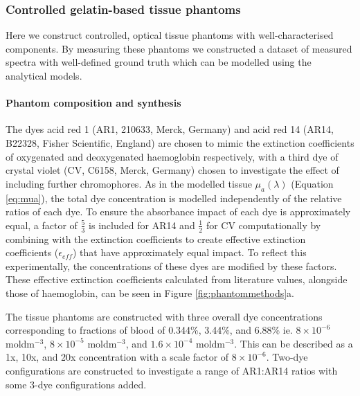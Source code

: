\subsubsection{Controlled gelatin-based tissue phantoms}\label{sec:methodsphantoms}
Here we construct controlled, optical tissue phantoms with well-characterised components. By measuring these phantoms we constructed a dataset of measured spectra with well-defined ground truth which can be modelled using the analytical models.

\paragraph{Phantom composition and synthesis}\label{sec:methodsphantomcomposition}

The dyes acid red 1 (AR1, 210633, Merck, Germany) and acid red 14 (AR14, B22328, Fisher Scientific, England) are chosen to mimic the extinction coefficients of oxygenated and deoxygenated haemoglobin respectively, with a third dye of crystal violet (CV, C6158, Merck, Germany) chosen to investigate the effect of including further chromophores. As in the modelled tissue $\mu_a(\lambda)$ (Equation \eqref{eq:mua}), the total dye concentration is modelled independently of the relative ratios of each dye. To ensure the absorbance impact of each dye is approximately equal, a factor of $\frac{5}{3}$ is included for AR14 and $\frac{1}{2}$ for CV computationally by combining with the extinction coefficients to create effective extinction coefficients ($\epsilon_{eff}$) that have approximately equal impact. To reflect this experimentally, the concentrations of these dyes are modified by these factors. These effective extinction coefficients calculated from literature values\cite{PhotochemCAD}, alongside those of haemoglobin\cite{Prahl1998}, can be seen in Figure \ref{fig:phantommethods}a. 

The tissue phantoms are constructed with three overall dye concentrations corresponding to fractions of blood of 0.344\%, 3.44\%, and 6.88\% ie. $8\times10^{-6}$ moldm$^{-3}$, $8\times10^{-5}$ moldm$^{-3}$, and $1.6\times10^{-4}$ moldm$^{-3}$. This can be described as a 1x, 10x, and 20x concentration with a scale factor of $8\times10^{-6}$.
Two-dye configurations are constructed to investigate a range of AR1:AR14 ratios with some 3-dye configurations added. 

